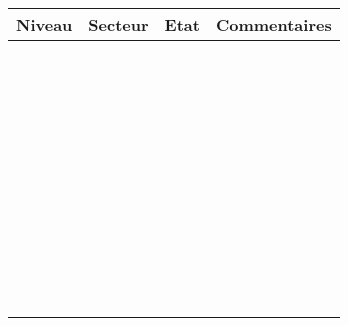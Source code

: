 \documentclass[a4paper]{article}
\begin{document}
\pagestyle{empty}

\begin{minipage}{5cm}
\renewcommand{\arraystretch}{.8}
\begin{tabular}{|p{1cm}|p{2.2cm}|p{.7cm}|p{3cm}|}
\hline
Niveau & Secteur & Etat \footnotemark & Commentaires \\
\hline
&&&\\
&&&\\
\hline
&&&\\
&&&\\
\hline
&&&\\
&&&\\
\hline
&&&\\
&&&\\
\hline
&&&\\
&&&\\
\hline
&&&\\
&&&\\
\hline
&&&\\
&&&\\
\hline
&&&\\
&&&\\
\hline
&&&\\
&&&\\
\hline
&&&\\
&&&\\
\hline
&&&\\
&&&\\
\hline
&&&\\
&&&\\
\hline
&&&\\
&&&\\
\hline
&&&\\
&&&\\
\hline
&&&\\
&&&\\
\hline
&&&\\
&&&\\
\hline
&&&\\
&&&\\
\hline
&&&\\
&&&\\
\hline
&&&\\
&&&\\
\hline
&&&\\
&&&\\
\hline
&&&\\
&&&\\
\hline
&&&\\
&&&\\
\hline
&&&\\
&&&\\

\end{tabular}
\end{minipage}
\end{document}
